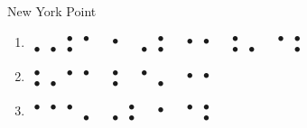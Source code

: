 \begin{refsection}
\begin{problem}{New York Point}{\namePLittell}{}
\begin{multicols}{2}
\begin{enumerate}
\item {\Large \boldmath$\begin{smallmatrix} 
     &  & \bullet & \bullet \\ \bullet &\bullet & \bullet &
\end{smallmatrix}$\ \ $\begin{smallmatrix}
  \bullet  \\  \,
\end{smallmatrix}$\ \ $\begin{smallmatrix}
  & \bullet \\ \bullet & \bullet
\end{smallmatrix}$\ \ $\begin{smallmatrix}
  \bullet & \bullet  \\ & 
\end{smallmatrix}$\ \ $\begin{smallmatrix}
  \bullet &   \\ \bullet& \bullet
\end{smallmatrix}$\ \ $\begin{smallmatrix}
  \bullet & \bullet  \\ & \bullet
\end{smallmatrix}$}

\item {\Large \boldmath$\begin{smallmatrix} 
    \bullet &  & \bullet & \bullet \\ \bullet &\bullet&  &
\end{smallmatrix}$\ \ $\begin{smallmatrix}
  \bullet \\  \bullet
\end{smallmatrix}$\ \ $\begin{smallmatrix}
  \bullet & \\ & \bullet
\end{smallmatrix}$\ \ $\begin{smallmatrix}
  \bullet & \bullet  \\  & 
\end{smallmatrix}$}

\item {\Large \boldmath$\begin{smallmatrix} 
    \bullet & \bullet & \bullet &  \\  & &  &\bullet
\end{smallmatrix}$\ \ $\begin{smallmatrix}
  & \bullet \\  \bullet& \bullet
\end{smallmatrix}$\ \ $\begin{smallmatrix}
  \bullet \\ \,
\end{smallmatrix}$\ \ $\begin{smallmatrix}
  \bullet & \bullet \\ & \bullet
\end{smallmatrix}$}


\end{enumerate}
\end{multicols}
\end{problem}
\end{refsection}
